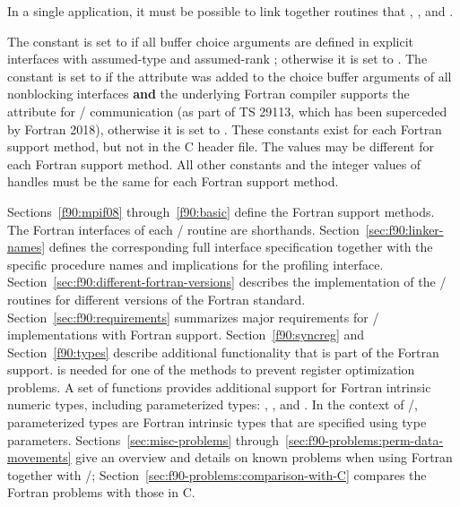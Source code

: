 In a single application, it must be possible to link together routines
that , , and .

The  constant 
is set to  if all buffer choice arguments are
defined in explicit interfaces with assumed-type
and assumed-rank \cite{fortran2018};
otherwise it is set to .
The   constant
 is set to 
if the  attribute was added to
the choice buffer arguments of all nonblocking interfaces
\textbf{and} the underlying Fortran compiler supports the 
attribute for \MPI/ communication (as part of TS 29113,
which has been superceded by Fortran 2018),
otherwise it is set to .
These constants exist for each Fortran support method,
but not in the C header file.
The values may be different for each Fortran support method.
All other constants and the integer values of handles
must be the same for each Fortran support method.

Sections~\ref{f90:mpif08} through~\ref{f90:basic} define the Fortran support methods.
The Fortran interfaces of each \MPI/ routine are shorthands.
Section~\ref{sec:f90:linker-names} defines the corresponding full
interface specification together with the specific procedure names and implications
for the profiling interface.
Section~\ref{sec:f90:different-fortran-versions} describes the implementation
of the \MPI/ routines for different versions of the Fortran standard.
Section~\ref{sec:f90:requirements} summarizes major requirements
for \MPI/ implementations with Fortran support.
Section~\ref{f90:syncreg} and Section~\ref{f90:types}
describe additional functionality that is part of the Fortran support.
 is needed for one of the methods to prevent
register optimization problems.
A set of functions provides additional support for Fortran
intrinsic numeric types, including parameterized types:
, ,
 and
.
In the context of \MPI/, parameterized
types are Fortran intrinsic types that are specified
using  type parameters.
Sections~\ref{sec:misc-problems}
through~\ref{sec:f90-problems:perm-data-movements} give an overview and details on known
problems when using Fortran together with \MPI/;
Section~\ref{sec:f90-problems:comparison-with-C} compares the Fortran problems with those in C.

